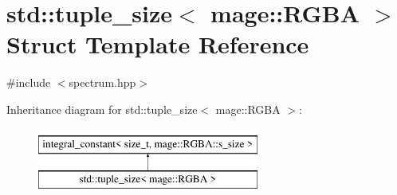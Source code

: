 \hypertarget{structstd_1_1tuple__size_3_01mage_1_1_r_g_b_a_01_4}{}\section{std\+:\+:tuple\+\_\+size$<$ mage\+:\+:R\+G\+BA $>$ Struct Template Reference}
\label{structstd_1_1tuple__size_3_01mage_1_1_r_g_b_a_01_4}


{\ttfamily \#include $<$spectrum.\+hpp$>$}

Inheritance diagram for std\+:\+:tuple\+\_\+size$<$ mage\+:\+:R\+G\+BA $>$\+:\begin{figure}[H]
\begin{center}
\leavevmode
\includegraphics[height=2.000000cm]{structstd_1_1tuple__size_3_01mage_1_1_r_g_b_a_01_4}
\end{center}
\end{figure}
